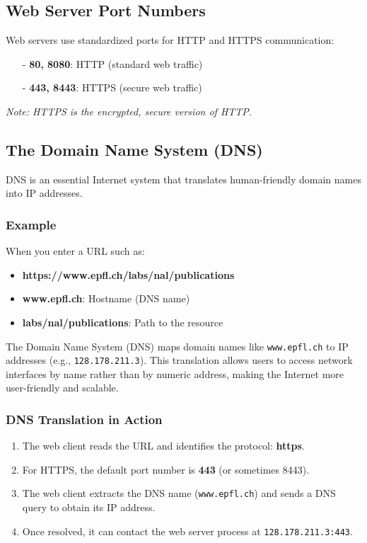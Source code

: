 \documentclass[../../compsys.tex]{subfiles}
\begin{document}
\subsection{Web Server Port Numbers}
Web servers use standardized ports for HTTP and HTTPS communication:
\begin{itemize}
    \item[-] \textbf{80, 8080}: HTTP (standard web traffic)
    \item[-] \textbf{443, 8443}: HTTPS (secure web traffic)
\end{itemize}
\textit{Note: HTTPS is the encrypted, secure version of HTTP.}
\subsection{The Domain Name System (DNS)}
DNS is an essential Internet system that translates human-friendly domain names into IP addresses.

\subsubsection{Example}
When you enter a URL such as:
\begin{itemize}
    \item \textbf{https://www.epfl.ch/labs/nal/publications}
    \item \textbf{www.epfl.ch}: Hostname (DNS name)
    \item \textbf{labs/nal/publications}: Path to the resource
\end{itemize}

\noindent The Domain Name System (DNS) maps domain names like \texttt{www.epfl.ch} to IP addresses (e.g., \texttt{128.178.211.3}). This translation allows users to access network interfaces by name rather than by numeric address, making the Internet more user-friendly and scalable.

\subsubsection{DNS Translation in Action}
\begin{enumerate}
    \item The web client reads the URL and identifies the protocol: \textbf{https}.
    \item For HTTPS, the default port number is \textbf{443} (or sometimes 8443).
    \item The web client extracts the DNS name (\texttt{www.epfl.ch}) and sends a DNS query to obtain its IP address.
    \item Once resolved, it can contact the web server process at \texttt{128.178.211.3:443}.
\end{enumerate}
\end{document}
